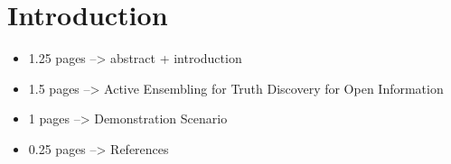 \section{Introduction}
\begin{itemize}
 \item 1.25 pages --> abstract + introduction
 \item 1.5 pages --> Active Ensembling for Truth Discovery for Open Information
 \item 1 pages --> Demonstration Scenario
 \item 0.25 pages --> References
\end{itemize}
